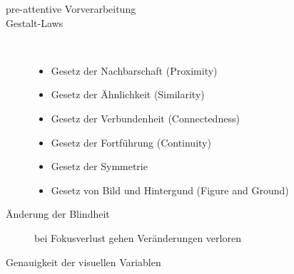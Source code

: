 \begin{description}
	\item[pre-attentive Vorverarbeitung]
	\item[Gestalt-Laws]\ \\\vspace*{-\baselineskip}
		\begin{itemize}
			\item Gesetz der Nachbarschaft (Proximity)
			\item Gesetz der Ähnlichkeit (Similarity)
			\item Gesetz der Verbundenheit (Connectedness)
			\item Gesetz der Fortführung (Continuity)
			\item Gesetz der Symmetrie
			\item Gesetz von Bild und Hintergund (Figure and Ground)
		\end{itemize}
	\item[Änderung der Blindheit] bei Fokusverlust gehen Veränderungen verloren
	\item[Genauigkeit der visuellen Variablen]\ \\\vspace*{-0.5\baselineskip}\\
		
\end{description}